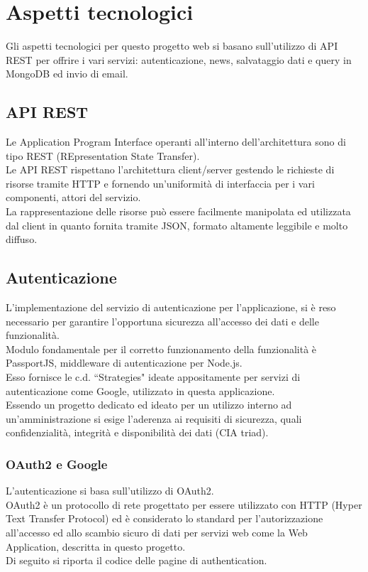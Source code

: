 \newpage
\section{Aspetti tecnologici}
\label{sec:capitolo}
\vspace{0.4 em}
\begin{flushleft}
Gli aspetti tecnologici per questo progetto web si basano sull’utilizzo di API REST per offrire i vari servizi: autenticazione, news, salvataggio dati e query in MongoDB ed invio di email. \\
\subsection{API REST}
Le Application Program Interface operanti all'interno dell'architettura sono di tipo REST (REpresentation State Transfer).\\
Le API REST rispettano l'architettura client/server gestendo le richieste di risorse tramite HTTP e fornendo un'uniformità di interfaccia per i vari componenti, attori del servizio.\\
La rappresentazione delle risorse può essere facilmente manipolata ed utilizzata dal client in quanto fornita tramite JSON, formato altamente leggibile e molto diffuso.\\

\subsection{Autenticazione}
L'implementazione del servizio di autenticazione per l'applicazione, si è reso necessario per garantire l'opportuna sicurezza all'accesso dei dati e delle funzionalità.\\
Modulo fondamentale per il corretto funzionamento della funzionalità è PassportJS, middleware di autenticazione per Node.js.\\
Esso fornisce le c.d. “Strategies" ideate appositamente per servizi di autenticazione come Google, utilizzato in questa applicazione.\\
Essendo un progetto dedicato ed ideato per un utilizzo interno ad un'amministrazione si esige l'aderenza ai requisiti di sicurezza, quali confidenzialità, integrità e disponibilità dei dati (CIA triad). 
\subsubsection{OAuth2 e Google}

L'autenticazione si basa sull'utilizzo di OAuth2. \\
OAuth2 è un protocollo di rete progettato per essere utilizzato con HTTP (Hyper Text Transfer Protocol) ed è considerato lo standard per l'autorizzazione all'accesso ed allo scambio sicuro di dati per servizi web come la Web Application, descritta in questo progetto.\\
Di seguito si riporta il codice delle pagine di authentication.



\end{flushleft}
